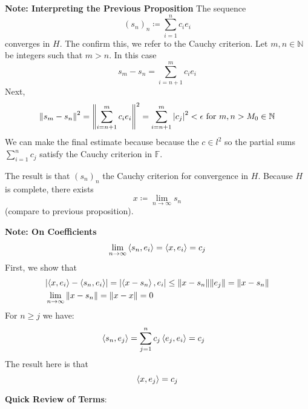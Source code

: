 \documentclass[11pt, a4paper]{article}
\newcommand{\F}{\mathbb{F}} %
\begin{document}
\textbf{Note: Interpreting the Previous Proposition}
The sequence 
\begin{equation*}
	(s_n)_n \coloneqq \sum_{i = 1}^{n} c_i e_i
\end{equation*}
converges in $ H $. The confirm this, we refer to the Cauchy criterion. Let $ m, n \in \mathbb{N} $ be integers such that $ m > n $. In this case 
\begin{equation*}
	s_m - s_n = \sum_{i = n + 1}^{m} c_i e_i
\end{equation*}
Next,
\begin{align*}
	\norm{s_m - s_n }^2 = \norm{\sum_{i = n + 1}^{m} c_i e_i}^2 = \sum_{i = n+1}^{m}\abs{c_j}^2 < \epsilon \text{ for } m, n > M_0 \in \mathbb{N}
\end{align*}
We can make the final estimate because because the $ c \in l^2 $ so the partial sums $ \sum_{i=1}^{n}c_j $ satisfy the Cauchy criterion in $ \F $.

The result is that $ (s_n)_n $ the Cauchy criterion for convergence in $ H $. Because $ H $ is complete, there exists 
\begin{equation*}
	x \coloneqq \lim_{n \to \infty} s_n 
\end{equation*}
(compare to previous proposition).

\textbf{Note: On Coefficients} 
\begin{align*}
	\lim_{n \to \infty} \expval{s_n, e_i} = \expval{x, e_i} = c_j
\end{align*}
First, we show that
\begin{align*}
	&\abs{\expval{x, e_i} - \expval{s_n, e_i}} = \abs{\expval{x - s_n}, e_i} \leq \norm{x - s_n} \norm{e_j} = \norm{x - s_n}\\
	&\lim_{n \to \infty} \norm{x - s_n} = \norm{x - x} = 0
\end{align*}
For $ n \geq j $ we have:
\begin{align*}
	&\expval{s_n, e_j} = \sum_{j = 1}^{n} c_j \expval{e_j, e_i} = c_j
\end{align*}
The result here is that
\begin{equation*}
	 \expval{x, e_j} = c_j
\end{equation*}

\textbf{Quick Review of Terms}:
\end{document}
